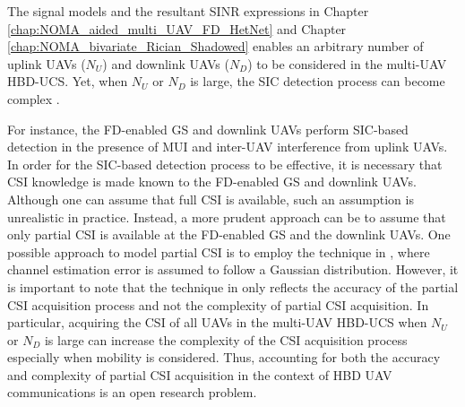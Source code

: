 The signal models and the resultant SINR expressions in Chapter \ref{chap:NOMA_aided_multi_UAV_FD_HetNet} and Chapter \ref{chap:NOMA_bivariate_Rician_Shadowed} enables an arbitrary number of uplink UAVs ($N_U$) and downlink UAVs ($N_D$) to be considered in the multi-UAV HBD-UCS. Yet, when $N_U$ or $N_D$ is large, the SIC detection process can become complex \cite{islam2017power,dai2018survey}. 

For instance, the FD-enabled GS and downlink UAVs perform SIC-based detection in the presence of MUI and inter-UAV interference from uplink UAVs. In order for the SIC-based detection process to be effective, it is necessary that CSI knowledge is made known to the FD-enabled GS and downlink UAVs. Although one can assume that full CSI is available, such an assumption is unrealistic in practice. Instead, a more prudent approach can be to assume that only partial CSI is available at the FD-enabled GS and the downlink UAVs. One possible approach to model partial CSI is to employ the technique in \cite{zlatanov2017capacity}, where channel estimation error is assumed to follow a Gaussian distribution. However, it is important to note that the technique in \cite{zlatanov2017capacity} only reflects the accuracy of the partial CSI acquisition process and not the complexity of partial CSI acquisition. In particular, acquiring the CSI of all UAVs in the multi-UAV HBD-UCS when $N_U$ or $N_D$ is large can increase the complexity of the CSI acquisition process especially when mobility is considered. Thus, accounting for both the accuracy and complexity of partial CSI acquisition in the context of HBD UAV communications is an open research problem.

